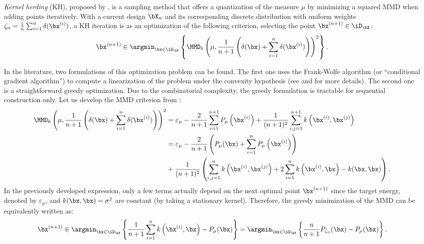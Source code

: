 \emph{Kernel herding} (KH), proposed by \cite{chen_welling_2010}, is a sampling method that offers a quantization of the measure $\mu$ by minimizing a squared MMD when adding points iteratively. 
With a current design $\bX_n$ and its corresponding discrete distribution with uniform weights $\zeta_n= \frac{1}{n} \sum_{i=1}^{n} \delta(\bx^{(i)})$, a KH iteration is as an optimization of the following criterion, selecting the point $\bx^{(n+1)} \in \iD_{\bX}$:
\begin{align}
   \bx^{(n+1)} \in \argmin_{\bx \in \iD_{\bX}} \left\{\MMD_k\left(\mu, \frac{1}{n+1} \left(\delta(\bx) + \sum_{i=1}^{n} \delta(\bx^{(i)})\right)\right)^2\right\}.
   \label{eq:mmd_criterion}
\end{align}

In the literature, two formulations of this optimization problem can be found. 
The first one uses the Frank-Wolfe algorithm (or ``conditional gradient algorithm'') to compute a linearization of the problem under the convexity hypothesis (see \cite{lacoste_2015} and \cite{briol_2015} for more details). 
The second one is a straightforward greedy optimization. Due to the combinatorial complexity, the greedy formulation is tractable for sequential construction only. 
Let us develop the MMD criterion from :
\begin{subequations}
\begin{align}
    \MMD_k\left(\mu, \frac{1}{n+1} \left(\delta(\bx) + \sum_{i=1}^{n} \delta(\bx^{(i)})\right)\right)^2
    &= \varepsilon_\mu - \frac{2}{n+1} \sum_{i=1}^{n+1} P_{\mu}\left(\bx^{(i)}\right) + \frac{1}{(n+1)^2} \sum_{i,j=1}^{n+1} k\left(\bx^{(i)}, \bx^{(j)}\right)\\
    &= \varepsilon_\mu - \frac{2}{n+1} \left(P_\mu(\bx) + \sum_{i=1}^n P_{\mu}\left(\bx^{(i)}\right)\right)\\ &+ \frac{1}{(n+1)^2} \left(\sum_{i,j=1}^n k\left(\bx^{(i)}, \bx^{(j)}\right) + 2\sum_{i=1}^n k\left(\bx^{(i)}, \bx\right) - k(\bx, \bx) \right).
\end{align}
\end{subequations}
In the previously developed expression, only a few terms actually depend on the next optimal point $\bx^{(n+1)}$ since the target energy, denoted by $\varepsilon_\mu$, and $k(\bx, \bx)=\sigma^2$ are constant (by taking a stationary kernel). 
Therefore, the greedy minimization of the MMD can be equivalently written as: 
\begin{equation}
    \bx^{(n+1)} \in \argmin_{\bx \in \iD_{\bX}} \left\{ \frac{1}{n+1} \sum_{i=1}^n k\left(\bx^{(i)}, \bx\right) - P_\mu(\bx) \right\} = \argmin_{\bx \in \iD_{\bX}} \left\{ \frac{n}{n+1} P_{\zeta_n}(\bx) - P_{\mu}(\bx)\right\}.
    \label{eq:greedy_formulation}
\end{equation}

